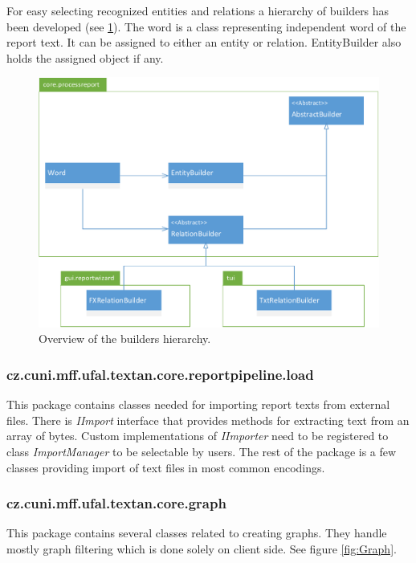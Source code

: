 For easy selecting recognized entities and relations a hierarchy of builders
has been developed (see \ref{fig:Builders}). The word is a class representing
independent word of the report text. It can be assigned to either an entity or
relation. EntityBuilder also holds the assigned object if any.

\begin{figure}[!htb]
        \centering
        \includegraphics[width=\textwidth]{Images/Builders}
        \caption{Overview of the builders hierarchy.}
        \label{fig:Builders}
\end{figure}

\subsubsection{cz.cuni.mff.ufal.textan.core.reportpipeline.load}

This package contains classes needed for importing report texts from external
files. There is \emph{IImport} interface that provides methods for extracting
text from an array of bytes. Custom implementations of \emph{IImporter} need
to be registered to class \emph{ImportManager} to be selectable by users. The
rest of the package is a few classes providing import of text files in most
common encodings.

\subsubsection{cz.cuni.mff.ufal.textan.core.graph}

This package contains several classes related to creating graphs. They handle
mostly graph filtering which is done solely on client side. See figure
\ref{fig:Graph}.

